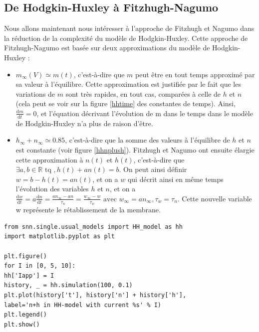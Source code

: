 \documentclass[12pt]{scrartcl}
\newcommand{\dd}{\mathrm{d}}
\begin{document}
\subsection{De Hodgkin-Huxley à Fitzhugh-Nagumo}
Nous allons maintenant nous intéresser à l'approche de Fitzhugh et Nagumo dans la réduction de la complexité du modèle de Hodgkin-Huxley. Cette approche de Fitzhugh-Nagumo est basée sur deux approximations du modèle de Hodgkin-Huxley : 
\begin{itemize}
\item $m_{\infty}(V) \simeq m(t)$, c'est-à-dire que $m$ peut être en tout temps approximé par sa valeur à l'équilibre. Cette approximation est justifiée par le fait que les variations de $m$ sont très rapides, en tout cas, comparées à celle de $h$ et $n$ (cela peut se voir sur la figure \ref{hhtime} des constantes de temps). Ainsi, $\frac{\dd m}{\dd t} = 0$, et l'équation décrivant l'évolution de m dans le temps dans le modèle de Hodgkin-Huxley n'a plus de raison d'être.
\item $h_\infty + n_\infty \simeq 0.85$, c'est-à-dire que la somme des valeurs à l'équilibre de $h$ et $n$ est constante (voir figure \ref{hhnplush}). Fitzhugh et Nagumo ont ensuite élargie cette approximation à $n(t)$ et $h(t)$, c'est-à-dire que $\exists a,b \in \mathbb{R} \text{ tq }, h(t) + an(t) = b$. On peut ainsi définir $w = b-h(t) = an(t)$, et on a $w$ qui décrit ainsi en même temps l'évolution des variables $h$ et $n$, et on a $\displaystyle \frac{\dd w}{\dd t} = a\frac{\dd n}{\dd t} = \frac{an_\infty -an}{\tau_n} = \frac{w_\infty-w}{\tau_w} \text{ avec } w_\infty=an_\infty, \tau_w = \tau_n$. Cette nouvelle variable w représente le rétablissement de la membrane. \end{itemize}

\begin{lstlisting}[caption = {Hodgkin-Huxley : Somme de n et h}]
from snn.single.usual_models import HH_model as hh
import matplotlib.pyplot as plt

plt.figure()
for I in [0, 5, 10]:
hh['Iapp'] = I
history, _ = hh.simulation(100, 0.1)
plt.plot(history['t'], history['n'] + history['h'], 
label='n+h in HH-model with current %s' % I)
plt.legend()
plt.show()
\end{lstlisting}
\end{document}
